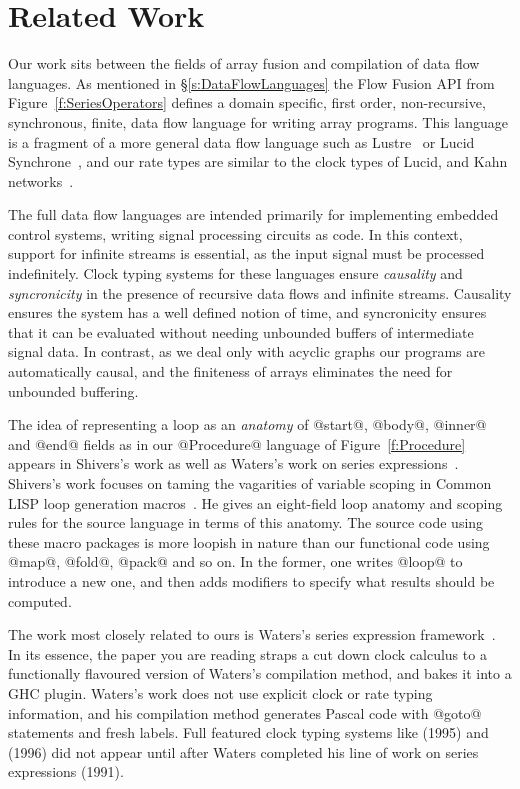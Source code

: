 
\section{Related Work}
\label{s:Related}

Our work sits between the fields of array fusion and compilation of data flow languages. As mentioned in \S\ref{s:DataFlowLanguages} the Flow Fusion API from Figure~\ref{f:SeriesOperators} defines a domain specific, first order, non-recursive, synchronous, finite, data flow language for writing array programs. This language is a fragment of a more general data flow language such as Lustre~\cite{Caspi:Lustre} or Lucid Synchrone~\cite{Pouzet:lucid-synchrone}, and our rate types are similar to the clock types of Lucid, and Kahn networks~\cite{Caspi:kahn-networks}. 

The full data flow languages are intended primarily for implementing embedded control systems, writing signal processing circuits as code. In this context, support for infinite streams is essential, as the input signal must be processed indefinitely. Clock typing systems for these languages ensure \emph{causality} and \emph{syncronicity} in the presence of recursive data flows and infinite streams. Causality ensures the system has a well defined notion of time, and syncronicity ensures that it can be evaluated without needing unbounded buffers of intermediate signal data. In contrast, as we deal only with acyclic graphs our programs are automatically causal, and the finiteness of arrays eliminates the need for unbounded buffering.

The idea of representing a loop as an \emph{anatomy} of @start@, @body@, @inner@ and @end@ fields as in our @Procedure@ language of Figure~\ref{f:Procedure} appears in Shivers's work \cite{Shivers:anatomy-of-a-loop} as well as Waters's work on series expressions~\cite{Waters:series-expressions}. Shivers's work focuses on taming the vagarities of variable scoping in Common LISP loop generation macros~\cite{Steele:lisp}. He gives an eight-field loop anatomy and scoping rules for the source language in terms of this anatomy. The source code using these macro packages is more loopish in nature than our functional code using @map@, @fold@, @pack@ and so on. In the former, one writes @loop@ to introduce a new one, and then adds modifiers to specify what results should be computed. 

The work most closely related to ours is Waters's series expression framework~\cite{Waters:series-expressions}. In its essence, the paper you are reading straps a cut down clock calculus to a functionally flavoured version of Waters's compilation method, and bakes it into a GHC plugin. Waters's work does not use explicit clock or rate typing information, and his compilation method generates Pascal code with @goto@ statements and fresh labels. Full featured clock typing systems like \cite{Caspi:functional-extension-to-lustre} (1995) and \cite{Caspi:kahn-networks} (1996) did not appear until after Waters completed his line of work on series expressions \cite{Waters:series-expressions} (1991). 

